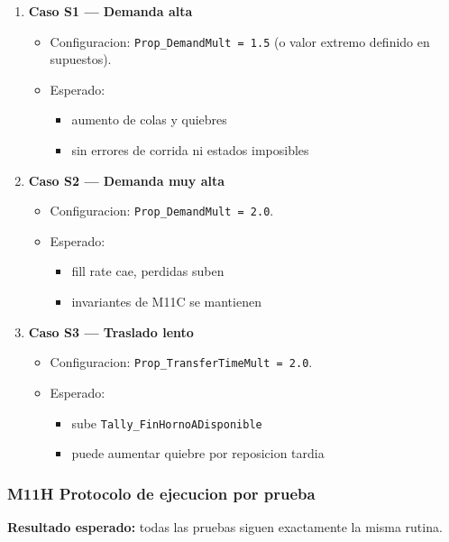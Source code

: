 \documentclass[11pt]{article}
\newcommand{\simio}[1]{\texttt{#1}}
\newcommand{\state}[1]{\texttt{#1}}
\begin{document}
\begin{enumerate}
  \item \textbf{Caso S1 --- Demanda alta}
  \begin{itemize}
    \item Configuracion: \state{Prop\_DemandMult = 1.5} (o valor extremo definido en supuestos).
    \item Esperado:
    \begin{itemize}
      \item aumento de colas y quiebres
      \item sin errores de corrida ni estados imposibles
    \end{itemize}
  \end{itemize}
  \item \textbf{Caso S2 --- Demanda muy alta}
  \begin{itemize}
    \item Configuracion: \state{Prop\_DemandMult = 2.0}.
    \item Esperado:
    \begin{itemize}
      \item fill rate cae, perdidas suben
      \item invariantes de M11C se mantienen
    \end{itemize}
  \end{itemize}
  \item \textbf{Caso S3 --- Traslado lento}
  \begin{itemize}
    \item Configuracion: \state{Prop\_TransferTimeMult = 2.0}.
    \item Esperado:
    \begin{itemize}
      \item sube \simio{Tally\_FinHornoADisponible}
      \item puede aumentar quiebre por reposicion tardia
    \end{itemize}
  \end{itemize}
\end{enumerate}

\subsubsection{M11H Protocolo de ejecucion por prueba}
\textbf{Resultado esperado:} todas las pruebas siguen exactamente la misma rutina.
\end{document}
